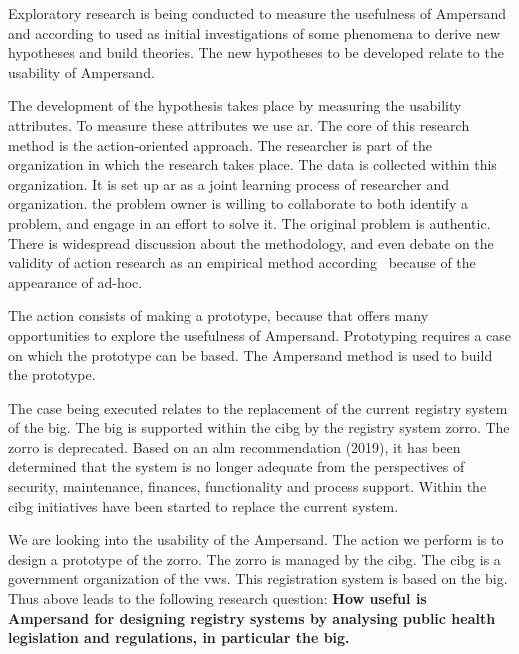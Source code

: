 Exploratory research is being conducted to measure the usefulness of Ampersand and according to \cite{Easterbrook} used as initial investigations of some phenomena to derive new hypotheses and build theories.
The new hypotheses to be developed relate to the usability of Ampersand.

The development of the hypothesis takes place by measuring the usability attributes.
To measure these attributes we use \acrshort{ar}\citep{Easterbrook}.
The core of this research method is the action-oriented approach.
The researcher is part of the organization in which the research takes place.
The data is collected within this organization.
It is set up \acrshort{ar} as a joint learning process of researcher and organization.
the problem owner is willing to collaborate to both identify a problem, and engage in an effort to solve it.
The original problem is authentic.
There is widespread discussion about the methodology, and even debate on the validity of action research as an empirical method according~\cite{Easterbrook} because of the appearance of ad-hoc.


The action consists of making a prototype, because that offers many opportunities to explore the usefulness of Ampersand.
Prototyping requires a case on which the prototype can be based.
The Ampersand method is used to build the prototype.

The case being executed relates to the replacement of the current registry system of the \acrshort{big}.
The \acrshort{big} is supported within the \acrshort{cibg} by the registry system \acrfull{zorro}.
The \acrshort{zorro} is deprecated.
Based on an \acrfull{alm} recommendation (2019)\citep{de_kok_analyse_2019}, it has been determined that the system is no longer adequate from the perspectives of security, maintenance, finances, functionality and process support.
Within the \acrshort{cibg} initiatives have been started to replace the current system.

We are looking into the usability of the Ampersand.
The action we perform is to design a prototype of the \acrshort{zorro}.
The \acrshort{zorro} is managed by the \acrshort{cibg}.
The \acrshort{cibg} is a government organization of the \acrlong{vws}.
This registration system is based on the \acrshort{big}.
Thus above leads to the following research question:
\newline
\textbf{How useful is Ampersand for designing registry systems by analysing public health legislation and regulations, in particular the \acrshort{big}.}


